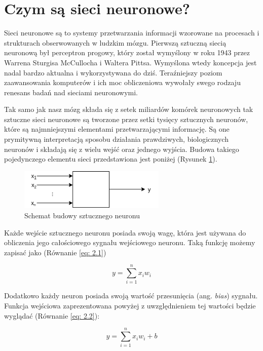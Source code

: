 \documentclass[12pt, oneside, a4paper]{report}
\begin{document}
\section{Czym są sieci neuronowe?}

Sieci neuronowe są to systemy przetwarzania informacji wzorowane na procesach i strukturach obserwowanych w ludzkim mózgu. Pierwszą sztuczną siecią neuronową był perceptron progowy, który został wymyślony w roku 1943 przez Warrena Sturgisa McCullocha i Waltera Pittsa. Wymyślona wtedy koncepcja jest nadal bardzo aktualna i wykorzystywana do dziś. Teraźniejszy poziom zaawansowania komputerów i ich moc obliczeniowa wywołały swego rodzaju renesans badań nad sieciami neuronowymi.

Tak samo jak nasz mózg składa się z setek miliardów komórek neuronowych tak sztuczne sieci neuronowe są tworzone przez setki tysięcy sztucznych neuronów, które są najmniejszymi elementami przetwarzającymi informację. Są one prymitywną interpretacją sposobu działania prawdziwych, biologicznych neuronów i składają się z wielu wejść oraz jednego wyjścia. Budowa takiego pojedynczego elementu sieci przedstawiona jest poniżej (Rysunek \ref{fig: 2.1}).

\begin{figure}[h]
	\centering
	\includegraphics[width=7cm]{fig211.png}
	\caption{Schemat budowy sztucznego neuronu}
	\label{fig: 2.1}
\end{figure}

Każde wejście sztucznego neuronu posiada swoją wagę, która jest używana do obliczenia jego całościowego sygnału wejściowego neuronu. Taką funkcję możemy zapisać jako (Równanie \ref{eq: 2.1})

\begin{equation}\label{eq: 2.1}
y = \sum^{n}_{i=1} x_{i}w_{i}
\end{equation}

Dodatkowo każdy neuron posiada swoją wartość przesunięcia (ang. \textit{bias}) sygnału. Funkcja wejściowa zaprezentowana powyżej z uwzględnieniem tej wartości będzie wyglądać (Równanie \ref{eq: 2.2}):

\begin{equation}\label{eq: 2.2}
  y = \sum^{n}_{i=1} x_{i}w_{i} + b
\end{equation}
\end{document}
